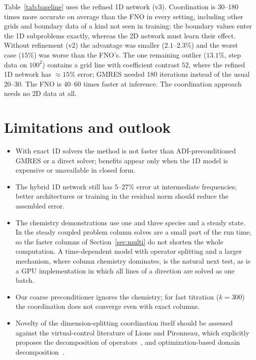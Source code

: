 \documentclass[11pt]{article}
\begin{document}
Table~\ref{tab:baseline} uses the refined 1D network (v3). Coordination is 30--180 times more accurate on
average than the FNO in every setting, including other grids and boundary data of a kind not seen in
training: the boundary values enter the 1D subproblems exactly, whereas the 2D network must learn their
effect. Without refinement (v2) the advantage was smaller ($2.1$--$2.3\%$) and the worst case ($15\%$) was
worse than the FNO's. The one remaining outlier ($13.1\%$, step data on $100^2$) contains a grid line with
coefficient contrast $52$, where the refined 1D network has $\approx15\%$ error; GMRES needed 180 iterations
instead of the usual 20--30. The FNO is 40--60 times faster at inference. The coordination approach needs no
2D data at all.

\section{Limitations and outlook}

\begin{itemize}
  \item With exact 1D solvers the method is not faster than ADI-preconditioned GMRES or a direct
        solver; benefits appear only when the 1D model is expensive or unavailable in closed form.
  \item The hybrid 1D network still has $5$--$27\%$ error at intermediate frequencies; better
        architectures or training in the residual norm should reduce the assembled error.
  \item The chemistry demonstrations use one and three species and a steady state. In the steady coupled
        problem column solves are a small part of the run time, so the faster columns of
        Section~\ref{sec:multi} do not shorten the whole computation. A time-dependent model with
        operator splitting and a larger mechanism, where column chemistry dominates, is the natural next
        test, as is a GPU implementation in which all lines of a direction are solved as one batch.
  \item Our coarse preconditioner ignores the chemistry; for fast titration ($k=300$) the coordination does
        not converge even with exact columns.
  \item Novelty of the dimension-splitting coordination itself should be assessed against the
        virtual-control literature of Lions and Pironneau, which explicitly proposes the decomposition of operators~\cite{lions1998,lions2000}, and optimization-based domain decomposition~\cite{gunzburger2000}.
\end{itemize}
\end{document}
